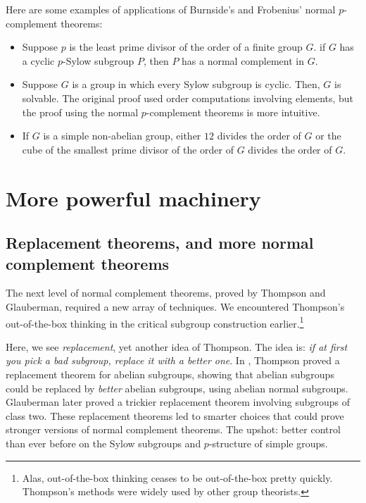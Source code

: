 \documentclass{amsart}
\begin{document}
Here are some examples of applications of Burnside's and Frobenius'
normal $p$-complement theorems:

\begin{itemize}

\item Suppose $p$ is the least prime divisor of the order of a finite
  group $G$. if $G$ has a cyclic $p$-Sylow subgroup $P$, then $P$ has
  a normal complement in $G$.

\item Suppose $G$ is a group in which every Sylow subgroup is
  cyclic. Then, $G$ is solvable. The original proof used order
  computations involving elements, but the proof using the normal
  $p$-complement theorems is more intuitive.

\item If $G$ is a simple non-abelian group, either $12$ divides the
  order of $G$ or the cube of the smallest prime divisor of the order
  of $G$ divides the order of $G$.

\end{itemize}

\section{More powerful machinery}

\subsection{Replacement theorems, and more normal complement theorems}

The next level of normal complement theorems, proved by Thompson and
Glauberman, required a new array of techniques. We encountered
Thompson's out-of-the-box thinking in the critical subgroup
construction earlier.\footnote{Alas, out-of-the-box thinking ceases to
  be out-of-the-box pretty quickly. Thompson's methods were widely used by other group theorists.}

Here, we see {\em replacement}, yet another idea of Thompson. The idea
is: {\em if at first you pick a bad subgroup, replace it with a better
  one}. In \cite{thompsonsreplacement}, Thompson proved a replacement
theorem for abelian subgroups, showing that abelian subgroups could be
replaced by {\em better} abelian subgroups, using abelian normal
subgroups. Glauberman later proved a trickier replacement theorem
involving subgroups of class two. These replacement theorems led to
smarter choices that could prove stronger versions of normal
complement theorems. The upshot: better control than ever before on
the Sylow subgroups and $p$-structure of simple groups.
\end{document}
